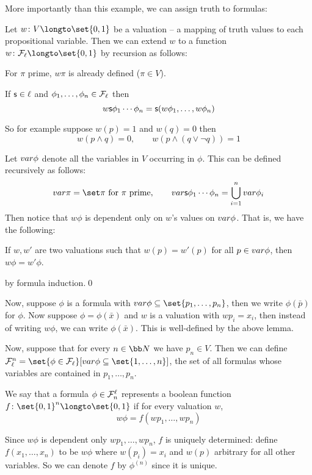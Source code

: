 More importantly than this example, we can assign truth to formulas:

\bdefn

    Let $w\colon V\longto\set{0,1}$ be a {\emphcolor valuation} -- a mapping of truth values to
    each propositional variable.
    Then we can extend $w$ to a function $w\colon{\cal F}_\ell\longto\set{0,1}$ by recursion as
    follows:
    \benum
        \item For $\pi$ prime, $w\pi$ is already defined ($\pi\in V$).
        \item If ${\sf s}\in\ell$ and $\phi_1,\dots,\phi_n\in{\cal F}_\ell$ then
        $$ w{\sf s}\phi_1\cdots\phi_n = {\sf s}(w\phi_1,\dots,w\phi_n) $$
    \eenum

\edefn

So for example suppose $w(p)=1$ and $w(q)=0$ then
$$ w(p\land q) = 0,\qquad w(p\land(q\lor\neg q)) = 1 $$

Let ${\sl var}\phi$ denote all the variables in $V$ occurring in $\phi$.
This can be defined recursively as follows:
$$ \var\pi=\set\pi\hbox{ for $\pi$ prime},\qquad
\var\s s\phi_1\cdots\phi_n = \bigcup_{i=1}^n\var\phi_i $$
Then notice that $w\phi$ is dependent only on $w$'s values on ${\sl var}\phi$.
That is, we have the following:

\blemm

    If $w,w'$ are two valuations such that $w(p)=w'(p)$ for all $p\in{\sl var}\phi$, then
    $w\phi=w'\phi$.

\elemm

\Proof by formula induction.\qed

Now, suppose $\phi$ is a formula with $\var\phi\subseteq\set{p_1,\dots,p_n}$, then we write
$\phi(\bar p)$ for $\phi$.
Now suppose $\phi=\phi(\bar x)$ and $w$ is a valuation with $wp_i=x_i$, then instead of writing
$w\phi$, we can write $\phi(\bar x)$.
This is well-defined by the above lemma.

Now, suppose that for every $n\in{\bb N}$ we have $p_n\in V$.
Then we can define ${\cal F}^n_\ell=\set{\phi\in{\cal F}_\ell}[\var\phi\subseteq\set{1,\dots,n}]$,
the set of all formulas whose variables are contained in $p_1,\dots,p_n$.

\bdefn

    We say that a formula $\phi\in{\cal F}^\ell_n$ {\emphcolor represents} a boolean function
    $f\colon\set{0,1}^n\longto\set{0,1}$ if for every valuation $w$,
    $$ w\phi = f(wp_1,\dots,wp_n) $$

\edefn

Since $w\phi$ is dependent only $wp_1,\dots,wp_n$, $f$ is uniquely determined: define
$f(x_1,\dots,x_n)$ to be $w\phi$ where $w(p_i)=x_i$ and $w(p)$ arbitrary for all other variables.
So we can denote $f$ by $\phi^{(n)}$ since it is unique.

